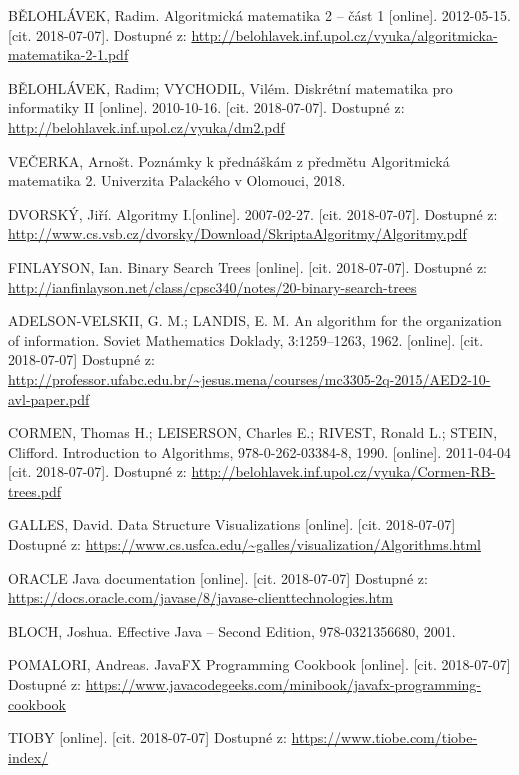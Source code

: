 \documentclass[
  biblatex=false,
  font=serif,
  glossaries=false,
  tables=false,
  theorems=false,
  index
]{kidiplom}
\begin{document}
\nocite{*}


\newpage


\begin{thebibliography}{99}	

 \uppercase{BĚlohlávek}, Radim. Algoritmická matematika 2 -- část 1 [online]. 2012-05-15. [cit. 2018-07-07]. Dostupné z: \url{http://belohlavek.inf.upol.cz/vyuka/algoritmicka-matematika-2-1.pdf}

 \uppercase{BĚlohlávek}, Radim; \uppercase{Vychodil}, Vilém. Diskrétní matematika pro informatiky II [online]. 2010-10-16. [cit. 2018-07-07]. Dostupné z: \url{http://belohlavek.inf.upol.cz/vyuka/dm2.pdf}

 \uppercase{veČerka}, Arnošt. Poznámky k přednáškám z předmětu Algoritmická matematika 2. Univerzita Palackého v Olomouci, 2018.

 \uppercase{DvorskÝ}, Jiří. Algoritmy I.[online]. 2007-02-27. [cit. 2018-07-07]. Dostupné z: \url{http://www.cs.vsb.cz/dvorsky/Download/SkriptaAlgoritmy/Algoritmy.pdf}

 \uppercase{Finlayson}, Ian. Binary Search Trees [online]. [cit. 2018-07-07].
Dostupné z: \url{http://ianfinlayson.net/class/cpsc340/notes/20-binary-search-trees}

 \uppercase{Adelson-Velskii}, G. M.; \uppercase{Landis}, E. M. An algorithm for the organization of information. Soviet Mathematics Doklady, 3:1259–1263, 1962. [online]. [cit. 2018-07-07] Dostupné z: \url{http://professor.ufabc.edu.br/~jesus.mena/courses/mc3305-2q-2015/AED2-10-avl-paper.pdf}

 \uppercase{Cormen}, Thomas H.; \uppercase{Leiserson}, Charles E.; \uppercase{Rivest}, Ronald L.; \uppercase{Stein}, Clifford. Introduction to Algorithms, 978-0-262-03384-8, 1990. [online]. 2011-04-04  [cit. 2018-07-07]. Dostupné z: \url{http://belohlavek.inf.upol.cz/vyuka/Cormen-RB-trees.pdf}

 \uppercase{Galles}, David. Data Structure Visualizations [online]. [cit. 2018-07-07]
Dostupné z: \url{https://www.cs.usfca.edu/~galles/visualization/Algorithms.html}

 ORACLE Java documentation [online]. [cit. 2018-07-07] Dostupné z: \url{https://docs.oracle.com/javase/8/javase-clienttechnologies.htm}

 \uppercase{Bloch}, Joshua. Effective Java -- Second Edition, 978-0321356680, 2001.

 \uppercase{Pomalori}, Andreas. JavaFX Programming Cookbook [online]. [cit. 2018-07-07] Dostupné z: \url{https://www.javacodegeeks.com/minibook/javafx-programming-cookbook}

 \uppercase{Tioby} [online]. [cit. 2018-07-07] Dostupné z: \url{https://www.tiobe.com/tiobe-index/}


\end{thebibliography}
\end{document}
